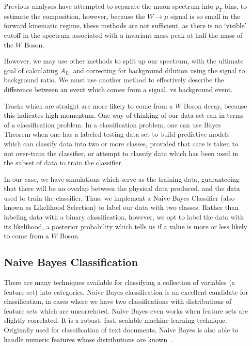 Previous analyses have attempted to separate the muon spectrum into $p_T$ bins,
to estimate the composition, however, because the $W\rightarrow\mu$ signal is so
small in the forward kinematic regime, these methods are not sufficient, as
there is no `visible' cutoff in the spectrum associated with a invariant mass
peak at half the mass of the $W$ Boson.

However, we may use other methods to split up our spectrum, with the ultimate
goal of calculating $A_L$, and correcting for background dilution using the
signal to background ratio. We must use another method to effectively describe
the difference between an event which comes from a signal, vs background event.

Tracks which are straight are more likely to come from a $W$ Boson decay,
because this indicates high momentum. One way of thinking of our data set can in
terms of a classification problem. In a classification problem, one can use
Bayes Theorem when one has a labeled testing data set to build predictive models
which can classify data into two or more classes, provided that care is taken to
not over-train the classifier, or attempt to classify data which has been used
in the subset of data to train the classifier.

In our case, we have simulations which serve as the training data, guaranteeing
that there will be no overlap between the physical data produced, and the data
used to train the classifier. Thus, we implement a Naive Bayes Classifier (also
known as Likelihood Selection) to label our data with two classes. Rather than
labeling data with a binary classification, however, we opt to label the data
with its likelihood, a posterior probability which tells us if a value is more
or less likely to come from a $W$ Boson.

\subsection{Naive Bayes Classification}
There are many techniques available for classifying a collection of variables
(a feature set) into categories. Naive Bayes classification is an excellent
candidate for classification, in cases where we have two classifications with
distributions of feature sets which are uncorrelated. Naive Bayes even works when
feature sets are slightly correlated. It is a robust, fast, scalable machine
learning technique. Originally used for classification of text documents,
Naive Bayes is also able to handle numeric features whose distributions are
known~\cite{Collins2013}.

